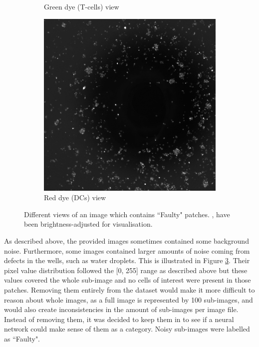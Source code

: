 \begin{figure}[h]
\begin{subfigure}[h!]{0.3\textwidth}
        \caption{Green dye (T-cells) view}
        \label{subfig:tcell}
    \end{subfigure}
    \begin{subfigure}[h!]{0.3\textwidth}
        \includegraphics[width=\textwidth]{dissertation/figures/faulty_dcell.jpg}
        \caption{Red dye (DCs) view}
        \label{subfig:dc}
    \end{subfigure}
    \caption{Different views of an image which contains ``Faulty" patches. \protect{}, \protect{} have been brightness-adjusted for visualisation.}
    \label{fig:noisyimage}
\end{figure}
As described above, the provided images sometimes contained some background noise. Furthermore, some images contained larger amounts of noise coming from defects in the wells, such as water droplets. This is illustrated in Figure \ref{fig:noisyimage}. Their pixel value distribution followed the [0, 255] range as described above but these values covered the whole sub-image and no cells of interest were present in those patches. Removing them entirely from the dataset would make it more difficult to reason about whole images, as a full image is represented by 100 sub-images, and would also create inconsistencies in the amount of sub-images per image file. Instead of removing them, it was decided to keep them in to see if a neural network could make sense of them as a category. Noisy sub-images were labelled as ``Faulty".

